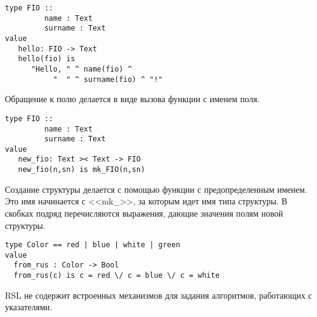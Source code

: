\begin{lstlisting}
type FIO ::
         name : Text
         surname : Text
value
   hello: FIO -> Text
   hello(fio) is
      "Hello, " ^ name(fio) ^
           "  " ^ surname(fio) ^ "!"
\end{lstlisting}

Обращение к полю делается в виде вызова функции с именем поля.

\begin{lstlisting}
type FIO ::
         name : Text
         surname : Text
value
   new_fio: Text >< Text -> FIO
   new_fio(n,sn) is mk_FIO(n,sn)
\end{lstlisting}

Создание структуры делается с помощью функции с предопределенным именем. Это имя начинается с <<mk\_>>, за которым идет имя типа структуры. В скобках подряд перечисляются выражения, дающие значения полям новой структуры.

\begin{lstlisting}
type Color == red | blue | white | green
value
  from_rus : Color -> Bool
  from_rus(c) is c = red \/ c = blue \/ c = white
\end{lstlisting}

RSL не содержит встроенных механизмов для задания алгоритмов, работающих с указателями.
